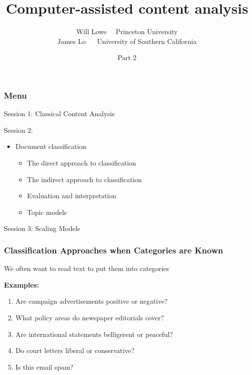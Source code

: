 \documentclass[11pt,compress,professionalfonts]{beamer}
\title{Computer-assisted content analysis}
\author{Will Lowe ~~Princeton University \\ James Lo ~~ University of Southern California}
\date{Part 2}
\newcommand{\ita}{\begin{itemize}}
\newcommand{\itm}{\item[]}
\newcommand{\itz}{\end{itemize}}
\begin{document}
\maketitle

%
%
%
%
%


%

\begin{frame}[t,fragile]\frametitle{Menu}

Session 1: Classical Content Analysis

Session 2:
\ita
\itm Document classification
\ita
\itm The direct approach to classification
\itm The indirect approach to classification
\itm Evaluation and interpretation
\itm Topic models
\itz
\itz

Session 3: Scaling Models

\end{frame}






\begin{frame}[t,fragile]\frametitle{Classification Approaches when Categories are Known}

We often want to read text to put them into categories

{\bf Examples:}

\begin{enumerate}
\item Are campaign advertisements positive or negative?
\item What policy areas do newspaper editorials cover?
\item Are international statements belligerent or peaceful?
\item Do court letters liberal or conservative?
\item Is this email spam?
\end{enumerate}


\end{frame}
\end{document}
